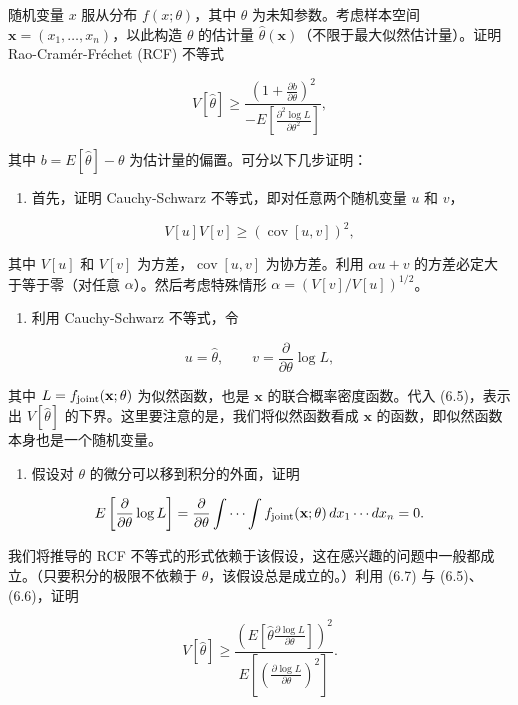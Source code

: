 \begin{question}
随机变量 \(x\) 服从分布 \(f(x;\theta)\)，其中 \(\theta\)
为未知参数。考虑样本空间 \(\mathbf{x}=(x_1,\ldots,x_n)\)，以此构造
\(\theta\) 的估计量
\(\hat\theta(\mathbf{x})\)（不限于最大似然估计量）。证明
Rao-Cramér-Fréchet (RCF) 不等式

\[
V[\hat\theta]\ge \frac{\left(1+\frac{\partial b}{\partial\theta}\right)^2}{-E\left[\frac{\partial^2\log L}{\partial\theta^2}\right]},
\]

其中 \(b=E[\hat\theta]-\theta\) 为估计量的偏置。可分以下几步证明：

\begin{enumerate}
\item
  首先，证明 Cauchy-Schwarz 不等式，即对任意两个随机变量 \(u\) 和
  \(v\)，
\end{enumerate}

\[
V[u]V[v]\ge (\operatorname{cov}[u,v])^2,
\]

其中 \(V[u]\) 和 \(V[v]\) 为方差，\(\operatorname{cov}[u,v]\)
为协方差。利用 \(\alpha u+v\) 的方差必定大于等于零（对任意
\(\alpha\)）。然后考虑特殊情形 \(\alpha=(V[v]/V[u])^{1/2}\)。

\begin{enumerate}[start=2]
\item
  利用 Cauchy-Schwarz 不等式，令
\end{enumerate}

\[
u=\hat\theta,\qquad v=\frac{\partial}{\partial\theta}\log L,
\]

其中 \(L=f_{\rm joint}(\mathbf{x};\theta)\) 为似然函数，也是
\(\mathbf{x}\) 的联合概率密度函数。代入 (6.5)，表示出 \(V[\hat\theta]\)
的下界。这里要注意的是，我们将似然函数看成 \(\mathbf{x}\)
的函数，即似然函数本身也是一个随机变量。

\begin{enumerate}[start=3]
\item
  假设对 \(\theta\) 的微分可以移到积分的外面，证明
\end{enumerate}

\[
E\left[\frac{\partial}{\partial\theta}\log L\right]
=\frac{\partial}{\partial\theta}\int\cdots\int f_{\rm joint}(\mathbf{x};\theta)\,dx_1\cdots dx_n=0.
\]

我们将推导的 RCF
不等式的形式依赖于该假设，这在感兴趣的问题中一般都成立。（只要积分的极限不依赖于
\(\theta\)，该假设总是成立的。）利用 (6.7) 与 (6.5)、(6.6)，证明

\[
V[\hat\theta]\ge \frac{\left(E\left[\hat\theta\frac{\partial\log L}{\partial\theta}\right]\right)^2}{E\left[\left(\frac{\partial\log L}{\partial\theta}\right)^2\right]}.
\]


\end{question}
